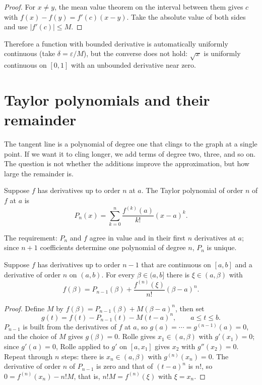 \begin{proof}
For $x\neq y$, the mean value theorem on the interval between them gives $c$
with $f(x)-f(y)=f'(c)(x-y)$. Take the absolute value of both sides and use $|f'(c)|\le M$.
\end{proof}

Therefore a function with bounded derivative is automatically uniformly continuous (take
$\delta=\varepsilon/M$), but the converse does not hold: $\sqrt{x}$ is uniformly continuous on
$[0,1]$ with an unbounded derivative near zero.

\section{Taylor polynomials and their remainder}

The tangent line is a polynomial of degree one that clings to the graph at a single point. If
we want it to cling longer, we add terms of degree two, three, and so on. The question is not
whether the additions improve the approximation, but how large the remainder is.

\begin{definisi}
Suppose $f$ has derivatives up to order $n$ at $a$. The Taylor polynomial of order $n$ of $f$
at $a$ is
\[
  P_{n}(x)=\sum_{k=0}^{n}\frac{f^{(k)}(a)}{k!}(x-a)^{k}.
\]
\end{definisi}

The requirement: $P_{n}$ and $f$ agree in value and in their first $n$ derivatives at $a$;
since $n+1$ coefficients determine one polynomial of degree $n$, $P_{n}$ is unique.

\begin{teorema}
Suppose $f$ has derivatives up to order $n-1$ that are continuous on $[a,b]$ and a derivative
of order $n$ on $(a,b)$. For every $\beta\in(a,b]$ there is $\xi\in(a,\beta)$ with
\[
  f(\beta)=P_{n-1}(\beta)+\frac{f^{(n)}(\xi)}{n!}(\beta-a)^{n}.
\]
\end{teorema}

\begin{proof}
Define $M$ by $f(\beta)=P_{n-1}(\beta)+M(\beta-a)^{n}$, then set
\[
  g(t)=f(t)-P_{n-1}(t)-M(t-a)^{n},\qquad a\le t\le b .
\]
$P_{n-1}$ is built from the derivatives of $f$ at $a$, so $g(a)=\cdots=g^{(n-1)}(a)=0$, and
the choice of $M$ gives $g(\beta)=0$. Rolle gives $x_{1}\in(a,\beta)$ with $g'(x_{1})=0$;
since $g'(a)=0$, Rolle applied to $g'$ on $[a,x_{1}]$ gives $x_{2}$ with $g''(x_{2})=0$.
Repeat through $n$ steps: there is $x_{n}\in(a,\beta)$ with $g^{(n)}(x_{n})=0$. The derivative
of order $n$ of $P_{n-1}$ is zero and that of $(t-a)^{n}$ is $n!$, so
$0=f^{(n)}(x_{n})-n!M$, that is, $n!M=f^{(n)}(\xi)$ with $\xi=x_{n}$.
\end{proof}

